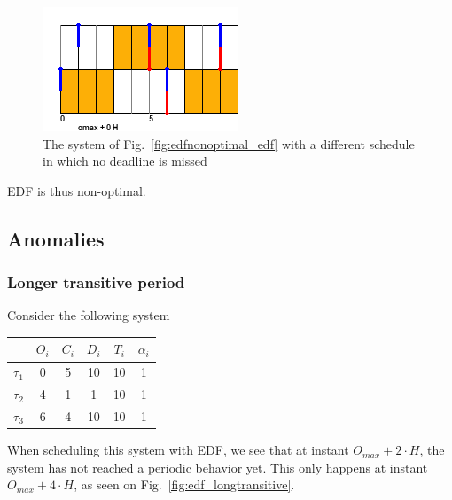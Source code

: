 \documentclass[a4paper,10pt]{article}
\begin{document}
        \begin{figure}[H]
        \begin{center}
            \includegraphics{figs/edfNonOptimal_PALLF.png}
            \caption{The system of Fig.~\ref{fig:edfnonoptimal_edf} with a different schedule in which no deadline is missed}
            \label{fig:edfnonoptimal_pallf}
        \end{center}
        \end{figure}

        EDF is thus non-optimal.

    \subsection{Anomalies}

        \subsubsection{Longer transitive period}
        Consider the following system

        \begin{center}
            \begin{tabular}{|r|c|c|c|c|c|}
                \hline
                            & $O_i$ & $C_i$ & $D_i$ & $T_i$ & $\alpha_i$ \\ \hline
                $\tau_1$    & 0     & 5     & 10   & 10    & 1     \\ \hline
                $\tau_2$    & 4     & 1     & 1    & 10    & 1     \\ \hline
                $\tau_3$    & 6     & 4     & 10   & 10    & 1     \\ \hline
            \end{tabular}
        \end{center}

        When scheduling this system with EDF, we see that at instant $O_{max} + 2 \cdot H$, the system has not reached a periodic behavior yet. This only happens at instant $O_{max} + 4 \cdot H$, as seen on Fig.~\ref{fig:edf_longtransitive}.\\
\end{document}
